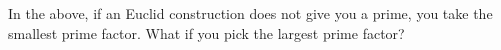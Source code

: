   In the above, if an Euclid construction does not give you a prime,
  you take the smallest prime factor.
  What if you pick the largest prime factor?
